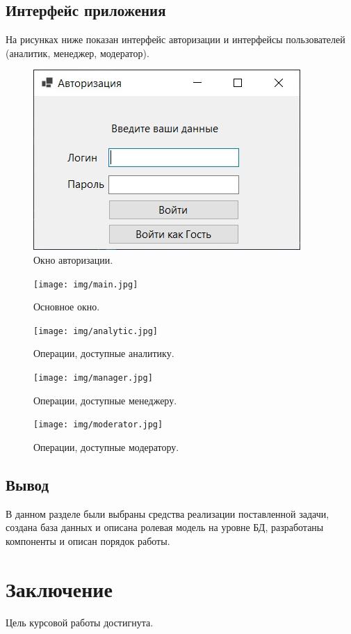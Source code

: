 \subsection{Интерфейс приложения}
На рисунках ниже показан интерфейс авторизации и интерфейсы пользователей (аналитик, менеджер, модератор).

\begin{figure}[h!]
	\centering
	\includegraphics[scale=1]{img/auth.jpg}
	\caption{Окно авторизации.}
	\label{img:auth}
\end{figure}
\begin{figure}[h!]
	\centering
	\texttt{[image: img/main.jpg]}
	\caption{Основное окно.}
	\label{img:main}
\end{figure}
\clearpage
\begin{figure}[h!]
	\centering
	\texttt{[image: img/analytic.jpg]}
	\caption{Операции, доступные аналитику.}
	\label{img:analytic}
\end{figure}
\clearpage
\begin{figure}[h!]
	\centering
	\texttt{[image: img/manager.jpg]}
	\caption{Операции, доступные менеджеру.}
	\label{img:manager}
\end{figure}
\clearpage
\begin{figure}[h!]
	\centering
	\texttt{[image: img/moderator.jpg]}
	\caption{Операции, доступные модератору.}
	\label{img:moderator}
\end{figure}

\subsection{Вывод}
В данном разделе были выбраны средства реализации поставленной задачи, создана база данных и описана ролевая модель на уровне БД, разработаны компоненты и описан порядок работы.
\newpage
\section*{Заключение}
Цель курсовой работы достигнута.

